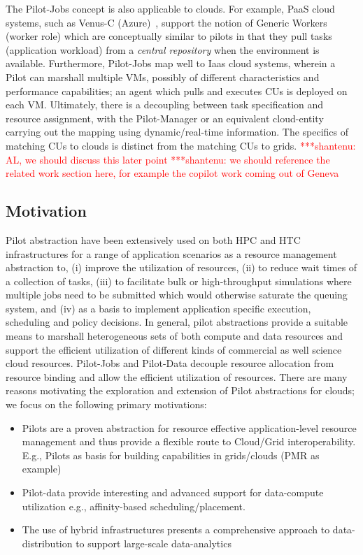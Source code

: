\documentclass[times]{cpeauth}
\newcommand{\jhanote}[1]{ {\textcolor{red} { ***shantenu: #1 }}}
\newcommand{\jhanote}[1]{}
\newcommand{\pilot}{Pilot\xspace}
\newcommand{\pilotjobs}{Pilot-Jobs\xspace}
\newcommand{\pilotdata}{Pilot-Data\xspace}
\newcommand{\cus}{CUs\xspace}
\begin{document}
The \pilotjobs concept is also applicable to clouds. For example, PaaS
cloud systems, such as Venus-C (Azure)~\cite{venusc-generic-worker},
support the notion of Generic Workers (worker role) which are
conceptually similar to pilots in that they pull tasks (application
workload) from a {\it central repository} when the environment is
available. Furthermore, \pilotjobs map well to Iaas cloud systems,
wherein a \pilot can marshall multiple VMs, possibly of different
characteristics and performance capabilities; an agent which pulls and
executes \cus is deployed on each VM. Ultimately, there is a
decoupling between task specification and resource assignment, with
the \pilot-Manager or an equivalent cloud-entity carrying out the
mapping using dynamic/real-time information. The specifics of matching
\cus to clouds is distinct from the matching \cus to
grids.\jhanote{AL, we should discuss this later point} \jhanote{we
  should reference the related work section here, for example the
  copilot work coming out of Geneva}

\subsection{Motivation}

\pilot abstraction have been extensively used on both HPC and HTC
infrastructures for a range of application scenarios as a resource
management abstraction to, (i) improve the utilization of resources,
(ii) to reduce wait times of a collection of tasks, (iii) to
facilitate bulk or high-throughput simulations where multiple jobs
need to be submitted which would otherwise saturate the queuing
system, and (iv) as a basis to implement application specific
execution, scheduling and policy decisions.  In general, pilot
abstractions provide a suitable means to marshall heterogeneous sets
of both compute and data resources and support the efficient
utilization of different kinds of commercial as well science cloud
resources.  \pilotjobs and \pilotdata decouple resource allocation
from resource binding and allow the efficient utilization of
resources.  There are many reasons motivating the exploration and
extension of \pilot abstractions for clouds; we focus on the following
primary motivations:

\begin{itemize}
\item Pilots are a proven abstraction for resource effective
  application-level resource management and thus provide a flexible
  route to Cloud/Grid interoperability. E.g., Pilots as basis for
  building capabilities in grids/clouds (PMR as example)
\item Pilot-data provide interesting and advanced support for
  data-compute utilization e.g., affinity-based scheduling/placement.
\item The use of hybrid infrastructures presents a comprehensive
  approach to data-distribution to support large-scale data-analytics
\end{itemize}
\end{document}

